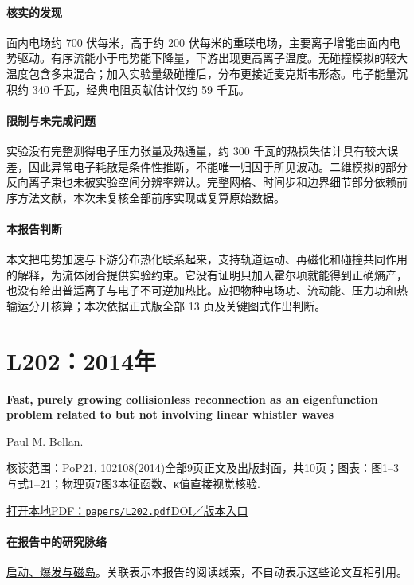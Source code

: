 \documentclass[UTF8,a4paper,11pt,openany,fontset=fandol]{ctexbook}
\begin{document}
\paragraph{核实的发现}面内电场约 700 伏每米，高于约 200 伏每米的重联电场，主要离子增能由面内电势驱动。有序流能小于电势能下降量，下游出现更高离子温度。无碰撞模拟的较大温度包含多束混合；加入实验量级碰撞后，分布更接近麦克斯韦形态。电子能量沉积约 340 千瓦，经典电阻贡献估计仅约 59 千瓦。

\paragraph{限制与未完成问题}实验没有完整测得电子压力张量及热通量，约 300 千瓦的热损失估计具有较大误差，因此异常电子耗散是条件性推断，不能唯一归因于所见波动。二维模拟的部分反向离子束也未被实验空间分辨率辨认。完整网格、时间步和边界细节部分依赖前序方法文献，本次未复核全部前序实现或复算原始数据。

\paragraph{本报告判断}本文把电势加速与下游分布热化联系起来，支持轨道运动、再磁化和碰撞共同作用的解释，为流体闭合提供实验约束。它没有证明只加入霍尔项就能得到正确熵产，也没有给出普适离子与电子不可逆加热比。应把物种电场功、流动能、压力功和热输运分开核算；本次依据正式版全部 13 页及关键图式作出判断。

\section{L202：2014年}\label{paper:L202}

\textbf{Fast,  purely growing collisionless reconnection as an eigenfunction problem related to but not involving linear whistler waves}\citep{L202}\

Paul M. Bellan.

\textsf{核读范围：}PoP21, 102108(2014)全部9页正文及出版封面，共10页；\textsf{图表：}图1–3与式1–21；物理页7图3本征函数、κ值直接视觉核验.

\href{run:../papers/L202.pdf}{打开本地PDF：\texttt{papers/L202.pdf}}\quad\href{https://doi.org/10.1063/1.4897375}{DOI／版本入口}

\paragraph{在报告中的研究脉络}\hyperref[story:onset]{启动、爆发与磁岛}。关联表示本报告的阅读线索，不自动表示这些论文互相引用。
\end{document}
